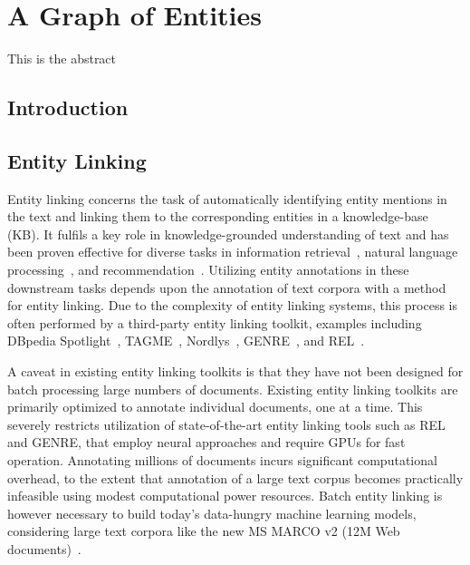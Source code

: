 \chapter{A Graph of Entities}
\label{a-graph-of-entities}

\begin{Abstract}
	\begin{changemargin}{1cm}{1cm}
		This is the abstract  
	\end{changemargin}
\end{Abstract}

\section{Introduction}

\section{Entity Linking}
Entity linking concerns the task of automatically identifying entity mentions in the text and linking them to the corresponding entities in a knowledge-base (KB). It fulfils a key role in knowledge-grounded understanding of text and has been proven effective for diverse tasks in information retrieval~\cite{Gerritse:2022:EMBERT, Gerritse:2020:GEER, doc-ranking-entity, el-ranking-hasibi, el-balog, query-recommendation-entity, chatterjee2022bert}, natural language processing~\cite{lin-etal-2012-entity, watson}, and recommendation~\cite{yang-etal-2018-collective}.
Utilizing entity annotations in these downstream tasks depends upon the annotation of text corpora with a method for entity linking. Due to the complexity of entity linking systems, this process is often performed by a third-party entity linking toolkit, examples including DBpedia Spotlight~\cite{dbpedia-spotlight}, TAGME~\cite{tagme}, Nordlys~\cite{nordlys}, GENRE~\cite{genre}, and REL~\cite{REL}. 

A caveat in existing entity linking toolkits is that they have not been designed for batch processing large numbers of documents. Existing entity linking toolkits are primarily optimized to annotate individual documents, one at a time. This severely restricts utilization of state-of-the-art entity linking tools such as REL and GENRE, that employ neural approaches and require GPUs for fast operation. Annotating millions of documents incurs significant computational overhead, to the extent that annotation of a large text corpus becomes practically infeasible using modest computational power resources. Batch entity linking is however necessary to build today's data-hungry machine learning models, considering large text corpora like the new MS MARCO v2 (12M Web documents)~\cite{msmarco}.

